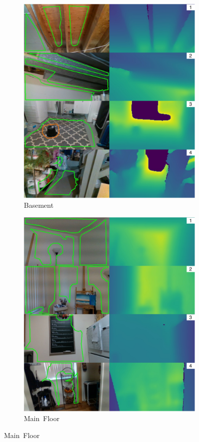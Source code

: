 \begin{figure}[H]

  \begin{subfigure}[t]{.48\linewidth}
    \centering
    \includegraphics[width=.8\linewidth]{chapter_3_polylidar3d/imgs/realsense/rgbd_polylidar3d-Basement_v1.pdf}
    \caption{Basement}
    \label{fig:ch3_rgbd_basement}
  \end{subfigure}
  \hfill
  \begin{subfigure}[t]{.48\linewidth}
    \centering
    \includegraphics[width=.8\linewidth]{chapter_3_polylidar3d/imgs/realsense/rgbd_polylidar3d-MainFloor_v1.pdf}
    \caption{Main~Floor}
    \label{fig:ch3_rgbd_main_floor}
  \end{subfigure}


\end{figure}
